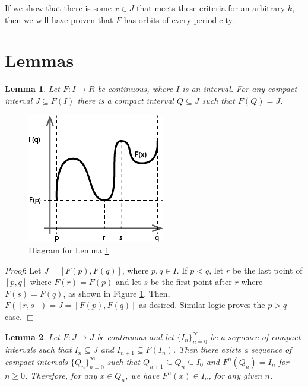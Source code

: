 \documentclass[12pt]{IEEEtran}
\newtheorem{lma}{Lemma}
\begin{document}
If we show that there is some $x \in J$ that meets these criteria for an arbitrary $k$, then we will have proven that $F$ has orbits of every periodicity.



\section{Lemmas}



\begin{lma}
\label{lma:cont_comp}
	Let $F : I \rightarrow R$ be continuous, where $I$ is an interval. For any compact interval $J \subseteq F(I)$ there is a compact interval $Q \subseteq J$ such that $F(Q) = J$.
\end{lma}

\begin{figure}
	\begin{center}
		\includegraphics{img/continuity_graph.png}
		\caption{Diagram for Lemma \ref{lma:cont_comp}}
        \label{fig:continuity_graph}
	\end{center}
\end{figure}

{\it Proof}: Let $J = \left[ F \left( p \right), F \left( q \right) \right]$, where $p, q \in I$. If $p < q$, let $r$ be the last point of $\left[ p, q\right]$ where $F \left( r \right) = F \left( p \right)$ and let $s$ be the first point after $r$ where $F \left( s \right) = F \left( q \right)$, as shown in Figure \ref{fig:continuity_graph}. Then, $F \left( \left[ r, s\right] \right) = J = \left[ F \left( p \right), F \left( q \right) \right]$ as desired. Similar logic proves the $p > q$ case. $\Box$


\begin{lma}
\label{lma:setsequence}
	Let $F : J \rightarrow J$ be continuous and let $\{I_n\}_{n=0}^{\infty}$ be a sequence of compact intervals such that $I_n \subseteq J$ and $I_{n+1} \subseteq F \left( I_n \right)$. Then there exists a sequence of compact intervals $\{Q_n\}_{n=0}^{\infty}$ such that $Q_{n+1} \subseteq Q_n \subseteq I_0$ and $F^n \left( Q_n \right) = I_n$ for $n \geq 0$. Therefore, for any $x \in Q_n$, we have $F^n \left( x \right) \in I_n$, for any given $n$.
\end{lma}
\end{document}

